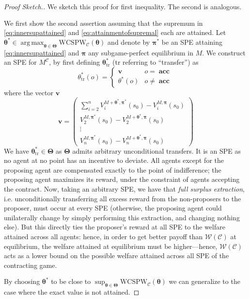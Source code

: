 \documentclass[referee,sn-basic]{sn-jnl}
\newcommand{\argmax}{\operatorname{arg\,max}}
\newcommand{\btheta}{\boldsymbol{\theta}}
\newcommand{\bpi}{\boldsymbol{\pi}}
\newcommand{\bTheta}{\boldsymbol{\Theta}}
\theoremstyle{thmstyleone}%
\theoremstyle{thmstyletwo}%
\theoremstyle{thmstylethree}%
\begin{document}
\begin{proof}[Proof Sketch.]
    We sketch this proof for first inequality. The second is analogous. 
    
   We first show the second assertion assuming that the supremum in \eqref{eq:innersupattained} and \eqref{eq:attainmentofsupremal} each are attained. Let $\btheta^* \in \argmax_{\btheta \in \bTheta} \mathrm{WCSPW}_\mathcal{C}(\btheta)$ and denote by $\bpi^*$ be an SPE attaining \eqref{eq:innersupattained} and $\bpi$ any subgame-perfect equilibrium in $M$. We construct an SPE for $M^{\mathcal{C}}$, by first defining $\btheta^*_{\text{tr}}$ (tr referring to \enquote{transfer}) as
    \[
    \theta^*_{\text{tr}}(o) = \begin{cases}
       \mathbf{v} & o = \mathbf{\operatorname{acc}}\\
       \theta^*(o) & o \neq\mathbf{\operatorname{acc}}
    \end{cases}
    \]
    where the vector $\mathbf v$
    \[
    \mathbf v = \begin{pmatrix}
        \sum_{i=2}^n V_i^{M+\btheta^*, \bpi^*}(s_0) - V_i^{M, \bpi}(s_0) \\
        V_2^{M, \bpi^*}(s_0) - V_2^{M+\btheta^*, \bpi}(s_0) \\
        \vdots \\
        V_n^{M, \bpi^*}(s_0) - V_n^{M+\btheta^*, \bpi}(s_0)
    \end{pmatrix}
    \]
    We have $\btheta^*_{\text{tr}} \in \bTheta$ as $\bTheta$ admits arbitrary unconditional transfers. It is an SPE as no agent at no point has an incentive to deviate. All agents except for the proposing agent are compensated exactly to the point of indifference; the proposing agent maximizes its reward, under the constraint of agents accepting the contract. Now, taking an arbitrary SPE, we have that \textit{full surplus extraction}, i.e. unconditionally transferring all excess reward from the non-proposers to the proposer, must occur at every SPE (otherwise, the proposing agent could unilaterally change by simply performing this extraction, and changing nothing else). But this directly ties the proposer's reward at all SPE to the welfare attained across all agents: hence, in order to get better payoff than $\mathcal{W}(\mathcal{C})$ at equilibrium, the welfare attained at equilibrium must be higher---hence, $\mathcal{W}(\mathcal{C})$ acts as a lower bound on the possible welfare attained across all SPE of the contracting game. 

    By choosing $\btheta^*$ to be close to $\sup_{\btheta \in \bTheta} \mathrm{WCSPW}_\mathcal{C}(\btheta)$ we can generalize to the case where the exact value is not attained.
\end{proof}
\end{document}
